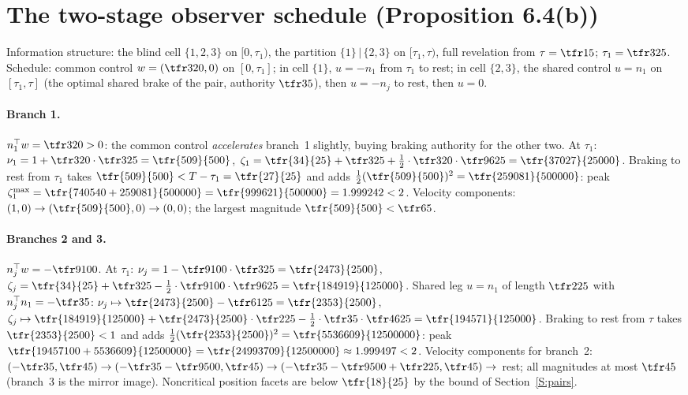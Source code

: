 \section{The two-stage observer schedule (Proposition 6.4(b))}\label{S:observer}

Information structure: the blind cell $\{1,2,3\}$ on $[0,\tau_1)$, the partition $\{1\}\,|\,\{2,3\}$ on $[\tau_1,\tau)$, full revelation from $\tau=\tfr15$; $\tau_1=\tfr3{25}$. Schedule: common control $w=(\tfr3{20},0)$ on $[0,\tau_1]$; in cell $\{1\}$, $u=-n_1$ from $\tau_1$ to rest; in cell $\{2,3\}$, the shared control $u=n_1$ on $[\tau_1,\tau]$ (the optimal shared brake of the pair, authority $\tfr35$), then $u=-n_j$ to rest, then $u=0$.

\paragraph{Branch 1.}
$n_1^\top w=\tfr3{20}>0$: the common control \emph{accelerates} branch~1 slightly, buying braking authority for the other two. At $\tau_1$: $\nu_1=1+\tfr3{20}\cdot\tfr3{25}=\tfr{509}{500}$, $\zeta_1=\tfr{34}{25}+\tfr3{25}+\tfrac12\cdot\tfr3{20}\cdot\tfr9{625}=\tfr{37027}{25000}$. Braking to rest from $\tau_1$ takes $\tfr{509}{500}<T-\tau_1=\tfr{27}{25}$ and adds $\tfrac12(\tfr{509}{500})^2=\tfr{259081}{500000}$: peak $\zeta_1^{\max}=\tfr{740540+259081}{500000}=\tfr{999621}{500000}=1.999242<2$. Velocity components: $(1,0)\to(\tfr{509}{500},0)\to(0,0)$; the largest magnitude $\tfr{509}{500}<\tfr65$.

\paragraph{Branches 2 and 3.}
$n_j^\top w=-\tfr9{100}$. At $\tau_1$: $\nu_j=1-\tfr9{100}\cdot\tfr3{25}=\tfr{2473}{2500}$, $\zeta_j=\tfr{34}{25}+\tfr3{25}-\tfrac12\cdot\tfr9{100}\cdot\tfr9{625}=\tfr{184919}{125000}$. Shared leg $u=n_1$ of length $\tfr2{25}$ with $n_j^\top n_1=-\tfr35$: $\nu_j\mapsto\tfr{2473}{2500}-\tfr6{125}=\tfr{2353}{2500}$, $\zeta_j\mapsto\tfr{184919}{125000}+\tfr{2473}{2500}\cdot\tfr2{25}-\tfrac12\cdot\tfr35\cdot\tfr4{625}=\tfr{194571}{125000}$. Braking to rest from $\tau$ takes $\tfr{2353}{2500}<1$ and adds $\tfrac12(\tfr{2353}{2500})^2=\tfr{5536609}{12500000}$: peak $\tfr{19457100+5536609}{12500000}=\tfr{24993709}{12500000}\approx1.999497<2$. Velocity components for branch~2: $(-\tfr35,\tfr45)\to(-\tfr35-\tfr9{500},\tfr45)\to(-\tfr35-\tfr9{500}+\tfr2{25},\tfr45)\to$ rest; all magnitudes at most $\tfr45$ (branch~3 is the mirror image). Noncritical position facets are below $\tfr{18}{25}$ by the bound of Section~\ref{S:pairs}.

